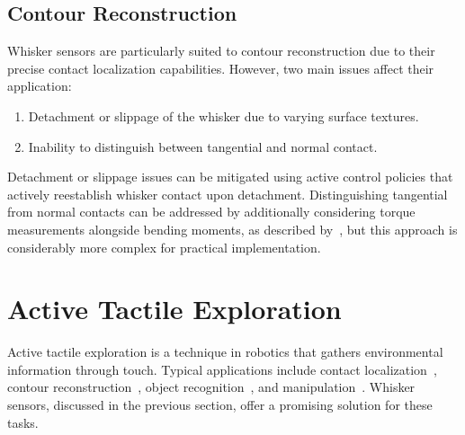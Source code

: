 \subsection{Contour Reconstruction}
Whisker sensors are particularly suited to contour reconstruction due to their precise contact localization capabilities.
However, two main issues affect their application:

\begin{enumerate}
    \item Detachment or slippage of the whisker due to varying surface textures.
    \item Inability to distinguish between tangential and normal contact.
\end{enumerate}

Detachment or slippage issues can be mitigated using active control policies that actively reestablish whisker contact upon detachment.
Distinguishing tangential from normal contacts can be addressed by additionally considering torque measurements alongside bending moments, as described by~\cite{doi:10.1089/soro.2016.0028}, but this approach is considerably more complex for practical implementation.


\section{Active Tactile Exploration}
Active tactile exploration is a technique in robotics that gathers environmental information through touch.
Typical applications include contact localization~\cite{doi:10.1089/soro.2016.0028}, contour reconstruction~\cite{lin2022whiskerinspiredtactilesensingcontact}, object recognition~\cite{Xiao_2022}, and manipulation~\cite{Brouwer2024TactileInformedAP}.
Whisker sensors, discussed in the previous section, offer a promising solution for these tasks.

